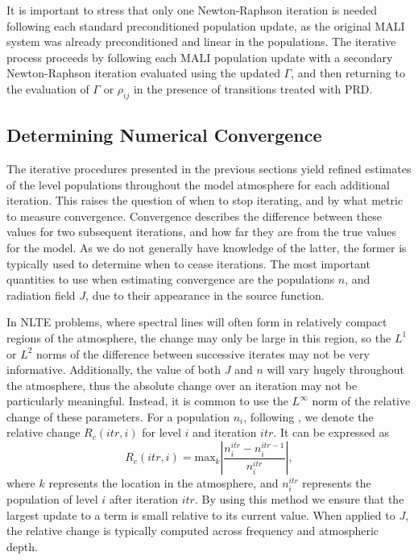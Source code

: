 It is important to stress that only one Newton-Raphson iteration is needed following each standard preconditioned population update, as the original MALI system was already preconditioned and linear in the populations.
The iterative process proceeds by following each MALI population update with a secondary Newton-Raphson iteration evaluated using the updated $\Gamma$, and then returning to the evaluation of $\Gamma$ or $\rho_{ij}$ in the presence of transitions treated with PRD.

\subsection{Determining Numerical Convergence}

The iterative procedures presented in the previous sections yield refined estimates of the level populations throughout the model atmosphere for each additional iteration.
This raises the question of when to stop iterating, and by what metric to measure convergence.
Convergence describes the difference between these values for two subsequent iterations, and how far they are from the true values for the model.
As we do not generally have knowledge of the latter, the former is typically used to determine when to cease iterations.
The most important quantities to use when estimating convergence are the populations $n$, and radiation field $J$, due to their appearance in the source function.

In NLTE problems, where spectral lines will often form in relatively compact regions of the atmosphere, the change may only be large in this region, so the $L^1$ or $L^2$ norms of the difference between successive iterates may not be very informative.
Additionally, the value of both $J$ and $n$ will vary hugely throughout the atmosphere, thus the absolute change over an iteration may not be particularly meaningful.
Instead, it is common to use the $L^\infty$ norm of the relative change of these parameters.
For a population $n_i$, following \citet{Auer1994a}, we denote the relative change $R_c(itr, i)$ for level $i$ and iteration $itr$.
It can be expressed as
\begin{equation}
    R_c(itr, i) = \mathrm{max}_k \left|\frac{n_i^{itr} - n_i^{itr-1}}{n_i^{itr}}\right|,
\end{equation}
where $k$ represents the location in the atmosphere, and $n_i^{itr}$ represents the population of level $i$ after iteration $itr$.
By using this method we ensure that the largest update to a term is small relative to its current value.
When applied to $J$, the relative change is typically computed across frequency and atmospheric depth.

